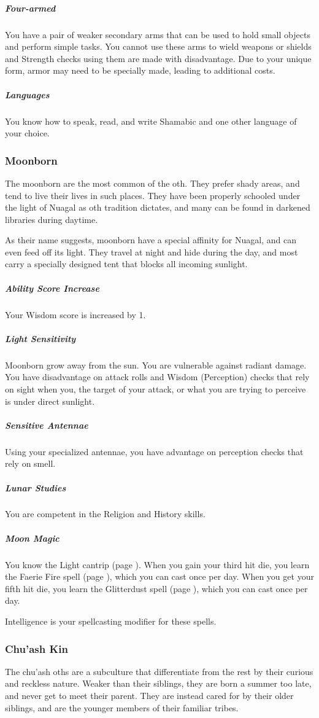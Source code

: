     \subparagraph{Four-armed} You have a pair of weaker secondary arms that can be used to hold small objects and perform simple tasks.
    You cannot use these arms to wield weapons or shields and Strength checks using them are made with disadvantage.
    Due to your unique form, armor may need to be specially made, leading to additional costs.

    \subparagraph{Languages} You know how to speak, read, and write Shamabic and one other language of your choice.

\subsubsection{Moonborn}
    The moonborn are the most common of the oth.
    They prefer shady areas, and tend to live their lives in such places.
    They have been properly schooled under the light of Nuagal as oth tradition dictates, and many can be found in darkened libraries during daytime.

    As their name suggests, moonborn have a special affinity for Nuagal, and can even feed off its light.
    They travel at night and hide during the day, and most carry a specially designed tent that blocks all incoming sunlight.

    \subparagraph{Ability Score Increase} Your Wisdom score is increased by 1.

    \subparagraph{Light Sensitivity} Moonborn grow away from the sun.
    You are vulnerable against radiant damage.
    You have disadvantage on attack rolls and Wisdom (Perception) checks that rely on sight when you, the target of your attack, or what you are trying to perceive is under direct sunlight.

    \subparagraph{Sensitive Antennae} Using your specialized antennae, you have advantage on perception checks that rely on smell.

    \subparagraph{Lunar Studies} You are competent in the Religion and History skills.

    \subparagraph{Moon Magic} You know the Light cantrip (page \pageref{spell::light}).
    When you gain your third hit die, you learn the Faerie Fire spell (page \pageref{spell::faeriefire}), which you can cast once per day.
    When you get your fifth hit die, you learn the Glitterdust spell (page \pageref{spell::glitterdust}), which you can cast once per day.

    Intelligence is your spellcasting modifier for these spells.

\subsubsection{Chu'ash Kin}
    The chu'ash oths are a subculture that differentiate from the rest by their curious and reckless nature.
    Weaker than their siblings, they are born a summer too late, and never get to meet their parent.
    They are instead cared for by their older siblings, and are the younger members of their familiar tribes.

